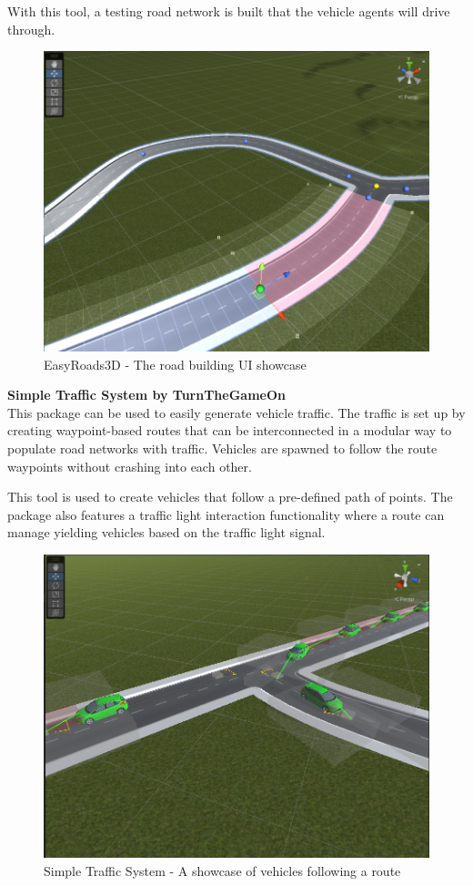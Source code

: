 \documentclass[0main.tex]{subfiles}
\begin{document}
With this tool, a testing road network is built that the vehicle agents will drive through.

\begin{figure}[htbp]
    \centering
    \includegraphics[width=.8\textwidth]{easy-roads.png}
    \caption{EasyRoads3D - The road building UI showcase}
    \label{fig-easyroads}
\end{figure}

\textbf{Simple Traffic System by TurnTheGameOn} \smallskip \\
This package can be used to easily generate vehicle traffic. The traffic is set up by creating
waypoint-based routes that can be interconnected in a modular way to populate road networks
with traffic. Vehicles are spawned to follow the route waypoints without crashing into each
other.

This tool is used to create vehicles that follow a pre-defined path of points. 
The package also features a traffic light interaction functionality where a route can manage
yielding vehicles based on the traffic light signal. 

\begin{figure}[htbp]
    \centering
    \includegraphics[width=.8\textwidth]{simple-traffic-system.png} 
    \caption{Simple Traffic System - A showcase of vehicles following a route}
    \label{fig-sts}
\end{figure}
\end{document}
